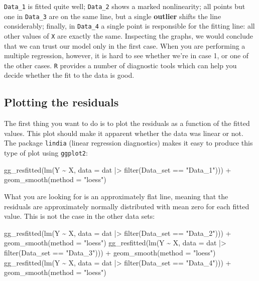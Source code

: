 \documentclass[
  letterpaper,
  DIV=11,
  numbers=noendperiod]{scrreprt}
\newenvironment{Shaded}{\begin{snugshade}}{\end{snugshade}}
\newcommand{\NormalTok}[1]{\textcolor[rgb]{0.00,0.23,0.31}{#1}}
\begin{document}
\texttt{Data\_1} is fitted quite well; \texttt{Data\_2} shows a marked
nonlinearity; all points but one in \texttt{Data\_3} are on the same
line, but a single \textbf{outlier} shifts the line considerably;
finally, in \texttt{Data\_4} a single point is responsible for the
fitting line: all other values of \texttt{X} are exactly the same.
Inspecting the graphs, we would conclude that we can trust our model
only in the first case. When you are performing a multiple regression,
however, it is hard to see whether we're in case 1, or one of the other
cases. \texttt{R} provides a number of diagnostic tools which can help
you decide whether the fit to the data is good.

\subsection{Plotting the residuals}\label{plotting-the-residuals}

The first thing you want to do is to plot the residuals as a function of
the fitted values. This plot should make it apparent whether the data
was linear or not. The package \texttt{lindia} (linear regression
diagnostics) makes it easy to produce this type of plot using
\texttt{ggplot2}:

\begin{Shaded}
\begin{Highlighting}[]
\NormalTok{gg\_resfitted(lm(Y \textasciitilde{} X, data = dat |\textgreater{} filter(Data\_set == "Data\_1"))) + geom\_smooth(method = "loess")}
\end{Highlighting}
\end{Shaded}

What you are looking for is an approximately flat line, meaning that the
residuals are approximately normally distributed with mean zero for each
fitted value. This is not the case in the other data sets:

\begin{Shaded}
\begin{Highlighting}[]
\NormalTok{gg\_resfitted(lm(Y \textasciitilde{} X, data = dat |\textgreater{} }
\NormalTok{                  filter(Data\_set == "Data\_2"))) + }
\NormalTok{  geom\_smooth(method = "loess")}
\NormalTok{gg\_resfitted(lm(Y \textasciitilde{} X, data = dat |\textgreater{} }
\NormalTok{                  filter(Data\_set == "Data\_3"))) + }
\NormalTok{  geom\_smooth(method = "loess")}
\NormalTok{gg\_resfitted(lm(Y \textasciitilde{} X, data = dat |\textgreater{} }
\NormalTok{                  filter(Data\_set == "Data\_4"))) + }
\NormalTok{  geom\_smooth(method = "loess")}
\end{Highlighting}
\end{Shaded}
\end{document}
